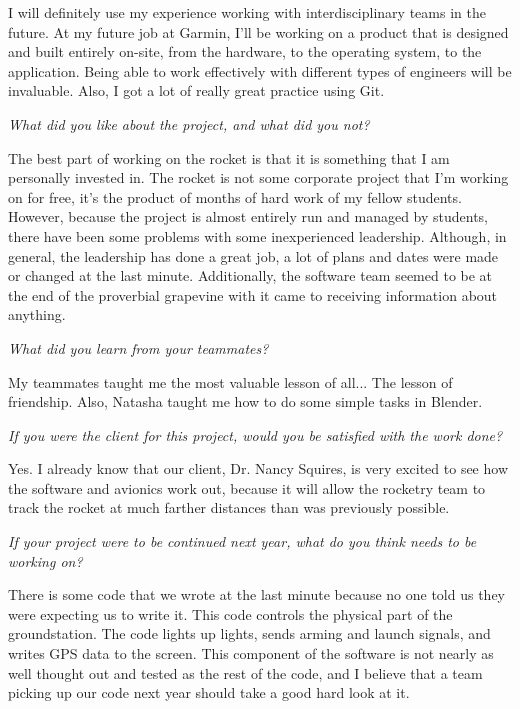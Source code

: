 \documentclass[10pt,draftclsnofoot,onecolumn]{IEEEtran}
\begin{document}
\begin{itemize}
	I will definitely use my experience working with interdisciplinary teams in the future. At my future job at Garmin, I'll be working on a product that is designed and built entirely on-site, from the hardware, to the operating system, to the application. Being able to work effectively with different types of engineers will be invaluable. Also, I got a lot of really great practice using Git.

	\textit{What did you like about the project, and what did you not?}

	The best part of working on the rocket is that it is something that I am personally invested in. The rocket is not some corporate project that I'm working on for free, it's the product of months of hard work of my fellow students. However, because the project is almost entirely run and managed by students, there have been some problems with some inexperienced leadership. Although, in general, the leadership has done a great job, a lot of plans and dates were made or changed at the last minute. Additionally, the software team seemed to be at the end of the proverbial grapevine with it came to receiving information about anything.

	\textit{What did you learn from your teammates?}

	My teammates taught me the most valuable lesson of all... The lesson of friendship. Also, Natasha taught me how to do some simple tasks in Blender.

	\textit{If you were the client for this project, would you be satisfied with the work done?}

	Yes. I already know that our client, Dr. Nancy Squires, is very excited to see how the software and avionics work out, because it will allow the rocketry team to track the rocket at much farther distances than was previously possible.

	\textit{If your project were to be continued next year, what do you think needs to be working on?}

	There is some code that we wrote at the last minute because no one told us they were expecting us to write it. This code controls the physical part of the groundstation. The code lights up lights, sends arming and launch signals, and writes GPS data to the screen. This component of the software is not nearly as well thought out and tested as the rest of the code, and I believe that a team picking up our code next year should take a good hard look at it.
\end{itemize}
\end{document}
